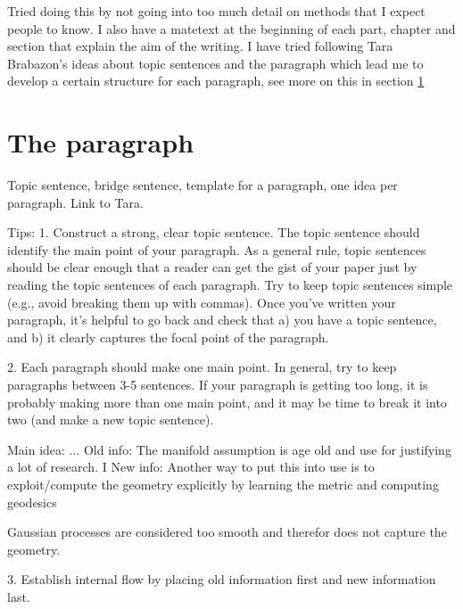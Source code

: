 Tried doing this by not going into too much detail on methods that I expect people to know. I also have a matetext at the beginning of each part, chapter and section that explain the aim of the writing. I have tried following Tara Brabazon's ideas about topic sentences and the paragraph which lead me to develop a certain structure for each paragraph, see more on this in section \ref{sec:theparagraph}



\section{The paragraph} \label{sec:theparagraph}
Topic sentence, bridge sentence, template for a paragraph, one idea per paragraph. Link to Tara.

Tips:
1. Construct a strong, clear topic sentence.
The topic sentence should identify the main point of your paragraph. As a general rule, topic sentences should be clear enough that a reader can get the gist of your paper just by reading the topic sentences of each paragraph. Try to keep topic sentences simple (e.g., avoid breaking them up with commas). Once you’ve written your paragraph, it’s helpful to go back and check that a) you have a topic sentence, and b) it clearly captures the focal point of the paragraph.

2. Each paragraph should make one main point. In general, try to keep paragraphs between 3-5 sentences. If your paragraph is getting too long, it is probably making more than one main point, and it may be time to break it into two (and make a new topic sentence).

Main idea: ...
Old info: The manifold assumption is age old and use for justifying a lot of research. I
New info: Another way to put this into use is to exploit/compute the geometry explicitly by learning the metric and computing geodesics

Gaussian processes are considered too smooth and therefor does not capture the geometry.




3. Establish internal flow by placing old information first and new information last.






